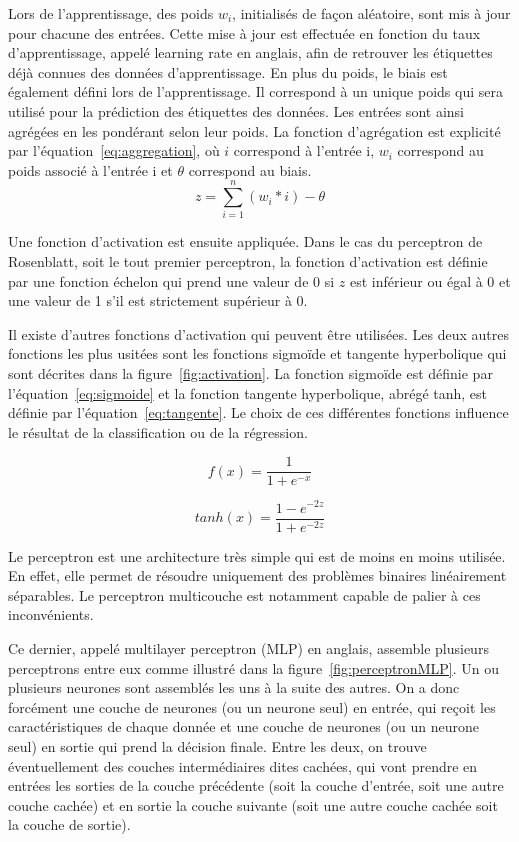 Lors de l'apprentissage, des poids $w_i$, initialisés de façon aléatoire, sont mis à jour pour chacune des entrées. Cette mise à jour est effectuée en fonction du taux d'apprentissage, appelé learning rate en anglais, afin de retrouver les étiquettes déjà connues des données d'apprentissage. En plus du poids, le biais est également défini lors de l'apprentissage. Il correspond à un unique poids qui sera utilisé pour la prédiction des étiquettes des données. Les entrées sont ainsi agrégées en les pondérant selon leur poids. La fonction d'agrégation est explicité par l'équation~\ref{eq:aggregation}, où $i$ correspond à l'entrée i, $w_i$ correspond au poids associé à l'entrée i et $\theta$ correspond au biais.
\begin{equation}
  z = \sum_{i=1}^{n}(w_i*i) - \theta
  \label{eq:aggregation}
\end{equation}

Une fonction d'activation est ensuite appliquée. Dans le cas du perceptron de Rosenblatt, soit le tout premier perceptron, la fonction d'activation est définie par une fonction échelon qui prend une valeur de 0 si $z$ est inférieur ou égal à 0 et une valeur de 1 s'il est strictement supérieur à 0.


Il existe d'autres fonctions d'activation qui peuvent être utilisées. Les deux autres fonctions les plus usitées sont les fonctions sigmoïde et tangente hyperbolique qui sont décrites dans la figure~\ref{fig:activation}. La fonction sigmoïde est définie par l'équation~\ref{eq:sigmoide} et la fonction tangente hyperbolique, abrégé tanh, est définie par l'équation~\ref{eq:tangente}. Le choix de ces différentes fonctions influence le résultat de la classification ou de la régression.

\begin{equation}
  f(x) = \frac{1}{1+ e^{-x}}
  \label{eq:sigmoide}
\end{equation}

\begin{equation}
  tanh(x) = \frac{1-e^{-2z}}{1+e^{-2z}}
  \label{eq:tangente}
\end{equation}

Le perceptron est une architecture très simple qui est de moins en moins utilisée. En effet, elle permet de résoudre uniquement des problèmes binaires linéairement séparables. Le perceptron multicouche est notamment capable de palier à ces inconvénients.


Ce dernier, appelé multilayer perceptron (MLP) en anglais, assemble plusieurs perceptrons entre eux comme illustré dans la figure~\ref{fig:perceptronMLP}. Un ou plusieurs neurones sont assemblés les uns à la suite des autres. On a donc forcément une couche de neurones (ou un neurone seul) en entrée, qui reçoit les caractéristiques de chaque donnée et une couche de neurones (ou un neurone seul) en sortie qui prend la décision finale. Entre les deux, on trouve éventuellement des couches intermédiaires dites cachées, qui vont prendre en entrées les sorties de la couche précédente (soit la couche d'entrée, soit une autre couche cachée) et en sortie la couche suivante (soit une autre couche cachée soit la couche de sortie).

